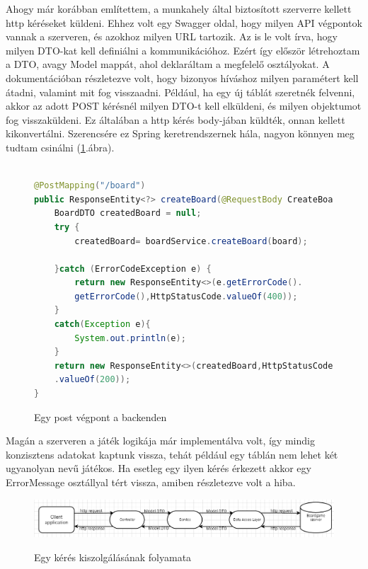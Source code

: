 \documentclass[a4paper,twoside]{article}
\begin{document}
Ahogy már korábban említettem, a munkahely által biztosított szerverre kellett http kéréseket
küldeni. Ehhez volt egy Swagger\cite{swagger} oldal, hogy milyen API végpontok vannak a szerveren, és
azokhoz milyen URL tartozik.  Az is le volt írva, hogy milyen DTO-kat kell definiálni a
kommunikációhoz. Ezért így először létrehoztam a DTO, avagy Model mappát, ahol deklaráltam a
megfelelő osztályokat. A dokumentációban részletezve volt, hogy bizonyos híváshoz milyen
paramétert kell átadni, valamint mit fog visszaadni. Például, ha egy új táblát szeretnék
felvenni, akkor az adott POST kérésnél milyen DTO-t kell elküldeni, és milyen objektumot
fog visszaküldeni. Ez általában a http kérés body-jában küldték, onnan kellett kikonvertálni. Szerencsére ez Spring keretrendszernek hála, nagyon könnyen meg tudtam csinálni (\ref{post-vegpont}.ábra).
\begin{figure}
	\caption{Egy post végpont a backenden}
	

	\begin{minipage}{\textwidth}
	\begin{lstlisting}[language=java,breaklines=true]
		
@PostMapping("/board")
public ResponseEntity<?> createBoard(@RequestBody CreateBoardDTO board) {
	BoardDTO createdBoard = null;
	try {
		createdBoard= boardService.createBoard(board);
		
	}catch (ErrorCodeException e) {
		return new ResponseEntity<>(e.getErrorCode().
		getErrorCode(),HttpStatusCode.valueOf(400));
	}
	catch(Exception e){
		System.out.println(e);
	}
	return new ResponseEntity<>(createdBoard,HttpStatusCode
	.valueOf(200));
}
	\end{lstlisting}
\end{minipage}

	\label{post-vegpont}
\end{figure} 

Magán a szerveren a játék logikája már implementálva volt, így mindig
konzisztens adatokat kaptunk vissza, tehát például egy táblán nem lehet két ugyanolyan nevű
játékos. Ha esetleg egy ilyen kérés érkezett akkor egy ErrorMessage osztállyal tért vissza,
amiben részletezve volt a hiba.

\begin{figure}
	\caption{Egy kérés kiszolgálásának folyamata}
	\raggedleft 
	\includegraphics[scale=0.45]{backend-pipeline}
	\label{backend-pipeline}
\end{figure}
\end{document}
